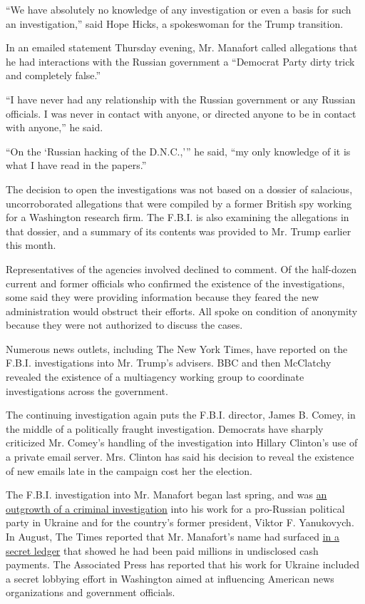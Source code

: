 ``We have absolutely no knowledge of any investigation or even a basis
for such an investigation,'' said Hope Hicks, a spokeswoman for the
Trump transition.

In an emailed statement Thursday evening, Mr. Manafort called
allegations that he had interactions with the Russian government a
``Democrat Party dirty trick and completely false.''

``I have never had any relationship with the Russian government or any
Russian officials. I was never in contact with anyone, or directed
anyone to be in contact with anyone,'' he said.

``On the `Russian hacking of the D.N.C.,''' he said, ``my only knowledge
of it is what I have read in the papers.''

The decision to open the investigations was not based on a dossier of
salacious, uncorroborated allegations that were compiled by a former
British spy working for a Washington research firm. The F.B.I. is also
examining the allegations in that dossier, and a summary of its contents
was provided to Mr. Trump earlier this month.

Representatives of the agencies involved declined to comment. Of the
half-dozen current and former officials who confirmed the existence of
the investigations, some said they were providing information because
they feared the new administration would obstruct their efforts. All
spoke on condition of anonymity because they were not authorized to
discuss the cases.

Numerous news outlets, including The New York Times, have reported on
the F.B.I. investigations into Mr. Trump's advisers. BBC and then
McClatchy revealed the existence of a multiagency working group to
coordinate investigations across the government.

The continuing investigation again puts the F.B.I. director, James B.
Comey, in the middle of a politically fraught investigation. Democrats
have sharply criticized Mr. Comey's handling of the investigation into
Hillary Clinton's use of a private email server. Mrs. Clinton has said
his decision to reveal the existence of new emails late in the campaign
cost her the election.

The F.B.I. investigation into Mr. Manafort began last spring, and was
\href{https://www.nytimes.com/2016/11/02/us/politics/fbi-james-comey-hillary-clinton-donald-trump.html}{an
outgrowth of a criminal investigation} into his work for a pro-Russian
political party in Ukraine and for the country's former president,
Viktor F. Yanukovych. In August, The Times reported that Mr. Manafort's
name had surfaced
\href{https://www.nytimes.com/2016/08/15/us/politics/paul-manafort-ukraine-donald-trump.html?_r=0}{in
a secret ledger} that showed he had been paid millions in undisclosed
cash payments. The Associated Press has reported that his work for
Ukraine included a secret lobbying effort in Washington aimed at
influencing American news organizations and government officials.

